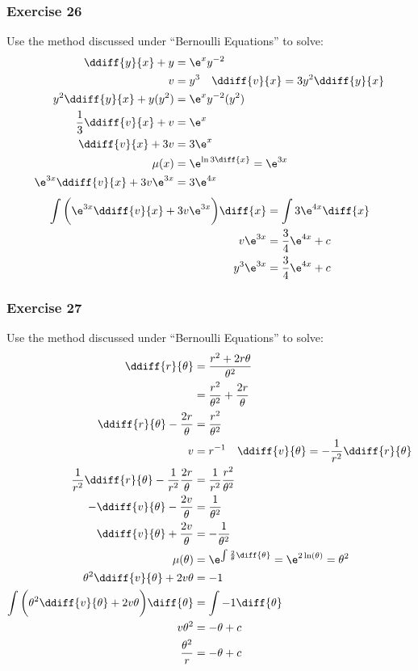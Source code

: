 \documentclass{math}
\begin{document}
\subsubsection*{Exercise 26}
Use the method discussed under ``Bernoulli Equations'' to solve:
\begin{align*}
  \ddiff{y}{x}+y &= \e^xy^{-2} \\
  v &= y^{3} \quad \ddiff{v}{x} = 3y^2\ddiff{y}{x} \\
  y^2\ddiff{y}{x}+y(y^2) &= \e^xy^{-2}(y^2) \\
  \frac{1}{3}\ddiff{v}{x}+v &= \e^x \\
  \ddiff{v}{x}+3v &= 3\e^x \\
  \mu(x) &= \e^{\ln3\diff{x}} = \e^{3x} \\
  \e^{3x}\ddiff{v}{x}+3v\e^{3x} &= 3\e^{4x}
\end{align*}
\begin{align*}
  \int\bigg(\e^{3x}\ddiff{v}{x}+3v\e^{3x}\bigg)\diff{x} &=
    \int3\e^{4x}\diff{x} \\
  v\e^{3x} &= \frac{3}{4}\e^{4x}+c \\
  y^{3}\e^{3x} &= \frac{3}{4}\e^{4x}+c \\
\end{align*}

\subsubsection*{Exercise 27}
Use the method discussed under ``Bernoulli Equations'' to solve:
\begin{align*}
  \ddiff{r}{\theta} &= \frac{r^2+2r\theta}{\theta^2} \\
  &= \frac{r^2}{\theta^2}+\frac{2r}{\theta} \\
  \ddiff{r}{\theta}-\frac{2r}{\theta} &= \frac{r^2}{\theta^2} \\
  v &= r^{-1} \quad \ddiff{v}{\theta} = -\frac{1}{r^2}\ddiff{r}{\theta} \\
  \frac{1}{r^2}\ddiff{r}{\theta}-\frac{1}{r^2}\frac{2r}{\theta} &=
    \frac{1}{r^2}\frac{r^2}{\theta^2} \\
  -\ddiff{v}{\theta}-\frac{2v}{\theta} &= \frac{1}{\theta^2} \\
  \ddiff{v}{\theta}+\frac{2v}{\theta} &= -\frac{1}{\theta^2} \\
  \mu(\theta) &= \e^{\int\frac{2}{\theta}\diff{\theta}} = \e^{2\ln(\theta)} =
    \theta^2 \\
  \theta^2\ddiff{v}{\theta}+2v\theta &= -1 \\
  \int\bigg(\theta^2\ddiff{v}{\theta}+2v\theta\bigg)\diff{\theta} &=
    \int-1\diff{\theta} \\
  v\theta^2 &= -\theta+c \\
  \frac{\theta^2}{r} &= -\theta+c
\end{align*}
\end{document}

